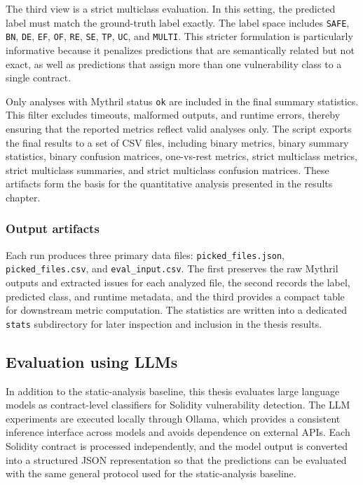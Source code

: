\documentclass[a4paper,11pt]{article}\usepackage{graphicx} %
\begin{document}
The third view is a strict multiclass evaluation. In this setting, the predicted label must match the ground-truth label exactly. The label space includes \texttt{SAFE}, \texttt{BN}, \texttt{DE}, \texttt{EF}, \texttt{OF}, \texttt{RE}, \texttt{SE}, \texttt{TP}, \texttt{UC}, and \texttt{MULTI}. This stricter formulation is particularly informative because it penalizes predictions that are semantically related but not exact, as well as predictions that assign more than one vulnerability class to a single contract.

Only analyses with Mythril status \texttt{ok} are included in the final summary statistics. This filter excludes timeouts, malformed outputs, and runtime errors, thereby ensuring that the reported metrics reflect valid analyses only. The script exports the final results to a set of CSV files, including binary metrics, binary summary statistics, binary confusion matrices, one-vs-rest metrics, strict multiclass metrics, strict multiclass summaries, and strict multiclass confusion matrices. These artifacts form the basis for the quantitative analysis presented in the results chapter.

\subsubsection{Output artifacts}

Each run produces three primary data files: \texttt{picked\_files.json}, \texttt{picked\_files.csv}, and \texttt{eval\_input.csv}. The first preserves the raw Mythril outputs and extracted issues for each analyzed file, the second records the label, predicted class, and runtime metadata, and the third provides a compact table for downstream metric computation. The statistics are written into a dedicated \texttt{stats} subdirectory for later inspection and inclusion in the thesis results.


\subsection{Evaluation using LLMs}

In addition to the static-analysis baseline, this thesis evaluates large language models as contract-level classifiers for Solidity vulnerability detection. The LLM experiments are executed locally through Ollama, which provides a consistent inference interface across models and avoids dependence on external APIs. Each Solidity contract is processed independently, and the model output is converted into a structured JSON representation so that the predictions can be evaluated with the same general protocol used for the static-analysis baseline.
\end{document}
